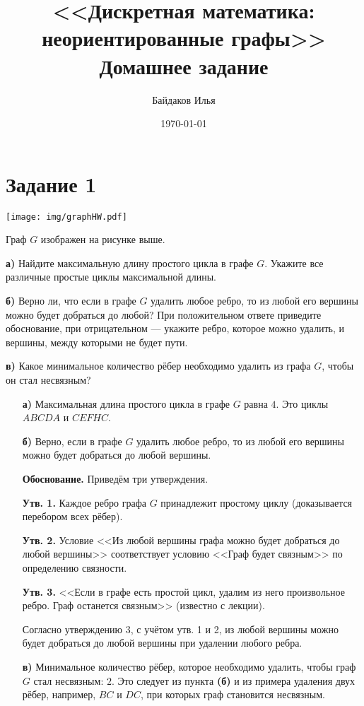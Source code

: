 \documentclass[a4paper,12pt]{article}
\begin{document}
\title{<<Дискретная математика: \\ неориентированные графы>> \\ \vspace{12pt} Домашнее задание}
\author{Байдаков Илья}
\date{\today}
\maketitle

\section*{Задание 1}
\begin{center}
\texttt{[image: img/graphHW.pdf]}
\end{center}
\vspace{-15 pt}
Граф $G$ изображен на рисунке выше.\par
{\bf а)} Найдите максимальную длину простого цикла в графе $G$. Укажите
все различные простые циклы максимальной длины.\par
{\bf б)} Верно ли, что если в графе $G$ удалить любое ребро, то из любой его
вершины можно будет добраться до любой? При положительном ответе
приведите обоснование, при отрицательном --- укажите ребро, которое
можно удалить, и вершины, между которыми не будет пути.\par
{\bf в)} Какое минимальное количество рёбер необходимо удалить из графа $G$, чтобы он стал несвязным?\par
\vspace{15 pt}
\begin{itemize}
\item[{\bf а)}] Максимальная длина простого цикла в графе $G$ равна $4$. Это циклы $ABCDA$ и $CEFHC$.\par
\item[{\bf б)}] Верно, если в графе $G$ удалить любое ребро, то из любой его вершины можно будет добраться до любой вершины. \par
{\bf Обоснование.} Приведём три утверждения.\par
{\bf Утв. 1.} Каждое ребро графа $G$ принадлежит простому циклу (доказывается перебором всех рёбер). \par
{\bf Утв. 2.} Условие <<Из любой вершины графа можно будет добраться до любой вершины>> соответствует условию <<Граф будет связным>> по определению связности. \par
{\bf Утв. 3.} <<Если в графе есть простой цикл, удалим из него произвольное ребро. Граф останется связным>> (известно с лекции).\par
Согласно утверждению 3, с учётом утв. 1 и 2, из любой вершины можно будет добраться до любой вершины при удалении любого ребра. \par
\item[{\bf в)}] Минимальное количество рёбер, которое необходимо удалить, чтобы граф $G$ стал несвязным: $2$. Это следует из пункта {\bf (б)} и из примера удаления двух рёбер, например, $BC$ и $DC$, при которых граф становится несвязным. 
\end{itemize}
\end{document}

